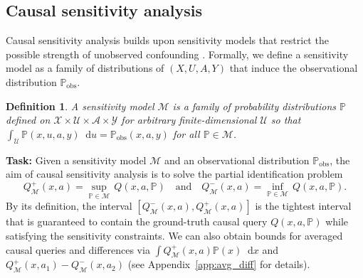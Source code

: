 \documentclass{article} %
\newcommand*\diff{\mathop{}\!\mathrm{d}}
\theoremstyle{definition}
\newtheorem{definition}{Definition}
\theoremstyle{plain}
\begin{document}
\subsection{Causal sensitivity analysis}

Causal sensitivity analysis builds upon sensitivity models that restrict the possible strength of unobserved confounding \citep[e.g.,][]{Rosenbaum.1983}. Formally, we define a sensitivity model as a family of distributions of $(X, U, A, Y)$ that induce the observational distribution $\mathbb{P}_\mathrm{obs}$.

\begin{definition}
\emph{A sensitivity model $\mathcal{M}$ is a family of probability distributions $\mathbb{P}$ defined on $\mathcal{X} \times \mathcal{U} \times \mathcal{A} \times \mathcal{Y}$ for arbitrary finite-dimensional $\mathcal{U}$ so that $\int_\mathcal{U} \mathbb{P}(x, u, a, y) \diff u = \mathbb{P}_\mathrm{obs}(x, a, y)$ for all $\mathbb{P} \in \mathcal{M}$.}
\end{definition}

\textbf{Task:} Given a sensitivity model $\mathcal{M}$ and an observational distribution $\mathbb{P}_\mathrm{obs}$, the aim of causal sensitivity analysis is to solve the partial identification problem
\begin{equation}\label{eq:partial_identification}
    Q^+_\mathcal{M}(x, a) =  \sup_{\mathbb{P} \in \mathcal{M}} \, Q(x, a, \mathbb{P}) \quad \text{and} \quad Q^-_\mathcal{M}(x, a) =  \inf_{\mathbb{P} \in \mathcal{M}} \, Q(x, a, \mathbb{P}).
\end{equation}
By its definition, the interval $[Q^-_\mathcal{M}(x, a), Q^+_\mathcal{M}(x, a)]$ is the tightest interval that is guaranteed to contain the ground-truth causal query $Q(x, a, \mathbb{P})$ while satisfying the sensitivity constraints. We can also obtain bounds for averaged causal queries and differences via $\int Q^+_\mathcal{M}(x, a) \mathbb{P}(x) \diff x$ and $Q^+_\mathcal{M}(x, a_1) - Q^-_\mathcal{M}(x, a_2)$ (see Appendix~\ref{app:avg_diff} for details). %
\end{document}
